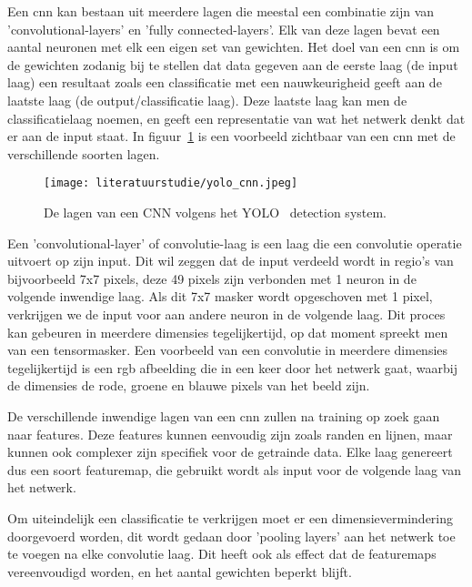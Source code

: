             Een \gls{cnn} kan bestaan uit meerdere lagen die meestal een combinatie zijn van 'convolutional-layers' en 'fully connected-layers'.
            Elk van deze lagen bevat een aantal neuronen met elk een eigen set van gewichten.
            Het doel van een \gls{cnn} is om de gewichten zodanig bij te stellen dat data gegeven aan de eerste laag (de input laag) een resultaat zoals een classificatie met een nauwkeurigheid geeft aan de laatste laag (de output/classificatie laag).
            Deze laatste laag kan men de classificatielaag noemen, en geeft een representatie van wat het netwerk denkt dat er aan de input staat.
            In figuur~\ref{fig:yolo_cnn} is een voorbeeld zichtbaar van een \gls{cnn} met de verschillende soorten lagen.

            \begin{figure}[!htb]
                \centering
                \texttt{[image: literatuurstudie/yolo\_cnn.jpeg]}
                \caption{De lagen van een CNN volgens het YOLO~\cite{Redmon_2016} detection system.}
                \label{fig:yolo_cnn}
            \end{figure}

            Een 'convolutional-layer' of convolutie-laag is een laag die een convolutie operatie uitvoert op zijn input.
            Dit wil zeggen dat de input verdeeld wordt in regio's van bijvoorbeeld 7x7 pixels, deze 49 pixels zijn verbonden met 1 neuron in de volgende inwendige laag.
            Als dit 7x7 masker wordt opgeschoven met 1 pixel, verkrijgen we de input voor aan andere neuron in de volgende laag.
            Dit proces kan gebeuren in meerdere dimensies tegelijkertijd, op dat moment spreekt men van een tensormasker.
            Een voorbeeld van een convolutie in meerdere dimensies tegelijkertijd is een \gls{rgb} afbeelding die in een keer door het netwerk gaat, waarbij de dimensies de rode, groene en blauwe pixels van het beeld zijn.

            De verschillende inwendige lagen van een \gls{cnn} zullen na training op zoek gaan naar features. Deze features kunnen eenvoudig zijn zoals randen en lijnen, maar kunnen ook complexer zijn specifiek voor de getrainde data.
            Elke laag genereert dus een soort featuremap, die gebruikt wordt als input voor de volgende laag van het netwerk.

            Om uiteindelijk een classificatie te verkrijgen moet er een dimensievermindering doorgevoerd worden, dit wordt gedaan door 'pooling layers' aan het netwerk toe te voegen na elke convolutie laag.
            Dit heeft ook als effect dat de featuremaps vereenvoudigd worden, en het aantal gewichten beperkt blijft.

